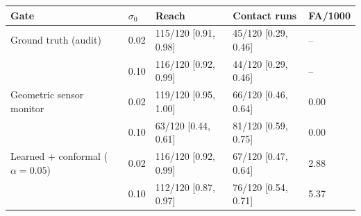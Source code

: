 \scriptsize
\setlength{\tabcolsep}{3pt}
\begin{tabular}{lllll}
\toprule
Gate & $\sigma_0$ & Reach & Contact runs & FA/1000 \\
\midrule
Ground truth (audit) & 0.02 & 115/120 [0.91, 0.98] & 45/120 [0.29, 0.46] & -- \\
 & 0.10 & 116/120 [0.92, 0.99] & 44/120 [0.29, 0.46] & -- \\
Geometric sensor monitor & 0.02 & 119/120 [0.95, 1.00] & 66/120 [0.46, 0.64] & 0.00 \\
 & 0.10 & 63/120 [0.44, 0.61] & 81/120 [0.59, 0.75] & 0.00 \\
Learned + conformal ($\alpha{=}0.05$) & 0.02 & 116/120 [0.92, 0.99] & 67/120 [0.47, 0.64] & 2.88 \\
 & 0.10 & 112/120 [0.87, 0.97] & 76/120 [0.54, 0.71] & 5.37 \\
\bottomrule
\end{tabular}
